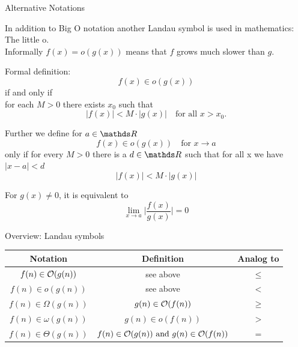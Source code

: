 \begin{vbframe}{Alternative Notations}

In addition to Big O notation another Landau symbol is used in mathematics: The little o.\\
Informally $f(x) = o(g(x))$ means that $f$ grows much slower than $g$.


\lz

\begin{block}{Formal definition:}
  $$
    f(x) \in o(g(x))
  $$
  if and only if\\
  for each $M > 0$ there exists $x_0$ such that
  $$
    |f(x)| < M \cdot |g(x)| \quad \text{for all } x > x_0.
  $$
\end{block}

\framebreak

Further we define for $a \in \R$
$$f(x) \in o(g(x)) \quad \text{for } x \rightarrow a $$
only if for every $M>0$ there is a $d \in \R$
such that for all x we have $|x - a| < d$
$$
|f(x)| < M \cdot |g(x)|
$$


\lz

For $g(x) \neq 0$, it is equivalent to
$$
\lim_{x \rightarrow a} \bigg|\frac{f(x)}{g(x)}\bigg|= 0
$$

\framebreak

\begin{block}{Overview: Landau symbols}
  \vspace*{-0.3cm}
  \begin{center}
    \begin{tabular}{ c | c | c}
      Notation & Definition & Analog to\\
      \hline
      $f(n) \in \mathcal{O}(g(n))$ & see above & $\leq$ \\
      $f(n) \in o(g(n))$ & see above & $<$\\
      $f(n) \in \Omega(g(n))$ & $g(n) \in \mathcal{O}(f(n))$ & $\geq$ \\
      $f(n) \in \omega(g(n))$ & $g(n) \in o(f(n))$ & $>$ \\
      $f(n) \in \Theta(g(n))$ &
      {\footnotesize $f(n) \in \mathcal{O}(g(n)) \text{ and } g(n) \in \mathcal{O}(f(n))$}
      & $=$ \\
    \end{tabular}
  \end{center}

\end{block}


\end{vbframe}
